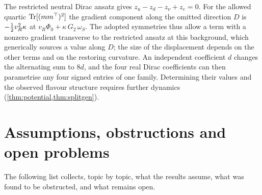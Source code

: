 The restricted neutral Dirac ansatz gives $z_u-z_d-z_\nu+z_e=0$. For the allowed quartic $\operatorname{Tr}[(mm^\top)^2]$ the gradient component along the
omitted direction $D$ is $-\tfrac12 v_R^2\kappa$ at $v_R\Phi_0+\kappa\,G_2\,\omega_S$. The adopted symmetries thus allow a term with a nonzero gradient
transverse to the restricted ansatz at this background, which generically sources a value along $D$; the size of the displacement depends on
the other terms and on the restoring curvature. An independent coefficient $d$ changes the alternating sum to $8d$, and the four real Dirac
coefficients can then parametrise any four signed entries of one family. Determining their values and the observed flavour structure
requires further dynamics (\cref{thm:potential,thm:splitgen}).

\section{Assumptions, obstructions and open problems}
\label{sec:open}

The following list collects, topic by topic, what the results assume, what was found to be obstructed, and what remains open.


